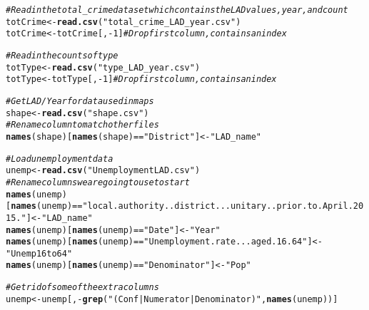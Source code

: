 \documentclass{article}\usepackage[]{graphicx}\usepackage[]{color}
\makeatletter
\newcommand{\hlnum}[1]{\textcolor[rgb]{0.686,0.059,0.569}{#1}}%
\newcommand{\hlstr}[1]{\textcolor[rgb]{0.192,0.494,0.8}{#1}}%
\newcommand{\hlcom}[1]{\textcolor[rgb]{0.678,0.584,0.686}{\textit{#1}}}%
\newcommand{\hlopt}[1]{\textcolor[rgb]{0,0,0}{#1}}%
\newcommand{\hlstd}[1]{\textcolor[rgb]{0.345,0.345,0.345}{#1}}%
\newcommand{\hlkwb}[1]{\textcolor[rgb]{0.69,0.353,0.396}{#1}}%
\newcommand{\hlkwd}[1]{\textcolor[rgb]{0.737,0.353,0.396}{\textbf{#1}}}%
\newenvironment{kframe}{%
 \def\at@end@of@kframe{}%
 \ifinner\ifhmode%
  \def\at@end@of@kframe{\end{minipage}}%
  \begin{minipage}{\columnwidth}%
 \fi\fi%
 \def\FrameCommand##1{\hskip\@totalleftmargin \hskip-\fboxsep
 \colorbox{shadecolor}{##1}\hskip-\fboxsep
     \hskip-\linewidth \hskip-\@totalleftmargin \hskip\columnwidth}%
 \MakeFramed {\advance\hsize-\width
   \@totalleftmargin\z@ \linewidth\hsize
   \@setminipage}}%
 {\par\unskip\endMakeFramed%
 \at@end@of@kframe}
\newenvironment{knitrout}{}{} %
\makeatother
\begin{document}
\begin{knitrout}
\color{fgcolor}\begin{kframe}
\begin{alltt}
\hlcom{#Read in the total_crime dataset which contains the LAD values, year, and count}
\hlstd{totCrime} \hlkwb{<-} \hlkwd{read.csv}\hlstd{(}\hlstr{"total_crime_LAD_year.csv"}\hlstd{)}
\hlstd{totCrime} \hlkwb{<-} \hlstd{totCrime[,}\hlopt{-}\hlnum{1}\hlstd{]} \hlcom{#Drop first column, contains an index}

\hlcom{#Read in the counts of type}
\hlstd{totType} \hlkwb{<-} \hlkwd{read.csv}\hlstd{(}\hlstr{"type_LAD_year.csv"}\hlstd{)}
\hlstd{totType} \hlkwb{<-} \hlstd{totType[,}\hlopt{-}\hlnum{1}\hlstd{]} \hlcom{#Drop first column, contains an index}

\hlcom{#Get LAD/Year for data used in maps}
\hlstd{shape} \hlkwb{<-} \hlkwd{read.csv}\hlstd{(}\hlstr{"shape.csv"}\hlstd{)}
\hlcom{#Rename column to match other files}
\hlkwd{names}\hlstd{(shape)[}\hlkwd{names}\hlstd{(shape)}\hlopt{==}\hlstr{"District"}\hlstd{]} \hlkwb{<-} \hlstr{"LAD_name"}

\hlcom{#Load unemployment data}
\hlstd{unemp} \hlkwb{<-} \hlkwd{read.csv}\hlstd{(}\hlstr{"UnemploymentLAD.csv"}\hlstd{)}
\hlcom{#Rename columns we are going to use to start}
\hlkwd{names}\hlstd{(unemp)[}\hlkwd{names}\hlstd{(unemp)}\hlopt{==}\hlstr{"local.authority..district...unitary..prior.to.April.2015."}\hlstd{]} \hlkwb{<-} \hlstr{"LAD_name"}
\hlkwd{names}\hlstd{(unemp)[}\hlkwd{names}\hlstd{(unemp)}\hlopt{==}\hlstr{"Date"}\hlstd{]} \hlkwb{<-} \hlstr{"Year"}
\hlkwd{names}\hlstd{(unemp)[}\hlkwd{names}\hlstd{(unemp)}\hlopt{==}\hlstr{"Unemployment.rate...aged.16.64"}\hlstd{]} \hlkwb{<-} \hlstr{"Unemp16to64"}
\hlkwd{names}\hlstd{(unemp)[}\hlkwd{names}\hlstd{(unemp)}\hlopt{==}\hlstr{"Denominator"}\hlstd{]} \hlkwb{<-} \hlstr{"Pop"}

\hlcom{#Get rid of some of the extra columns}
\hlstd{unemp} \hlkwb{<-} \hlstd{unemp[,}\hlopt{-}\hlkwd{grep}\hlstd{(}\hlstr{"(Conf|Numerator|Denominator)"}\hlstd{,}\hlkwd{names}\hlstd{(unemp))]}


\end{alltt}
\end{kframe}
\end{knitrout}
\end{document}
